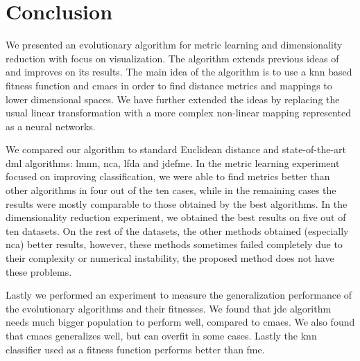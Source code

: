 \documentclass[12pt,a4paper]{report}
\begin{document}








\chapter*{Conclusion} \label{chap:conclusion}

We presented an evolutionary algorithm for metric learning and dimensionality reduction with focus on visualization. The algorithm extends previous ideas of \cite{fukui2013evolutionary} and improves on its results. The main idea of the algorithm is to use a \ac{knn} based fitness function and \ac{cmaes} in order to find distance metrics and mappings to lower dimensional spaces. We have further extended the ideas by replacing the usual linear transformation with a more complex non-linear mapping represented as a neural networks.

We compared our algorithm to standard Euclidean distance and state-of-the-art \acl{dml} algorithms: \ac{lmnn}, \ac{nca}, \ac{lfda} and \ac{jdefme}. In the metric learning experiment focused on improving classification, we were able to find metrics better than other algorithms in four out of the ten cases, while in the remaining cases the results were mostly comparable to those obtained by the best algorithms. In the dimensionality reduction experiment, we obtained the best results on five out of ten datasets. On the rest of the datasets, the other methods obtained (especially \ac{nca}) better results, however, these methods sometimes failed completely due to their complexity or numerical instability, the proposed method does not have these problems.

Lastly we performed an experiment to measure the generalization performance of the evolutionary algorithms and their fitnesses. We found that \ac{jde} algorithm needs much bigger population to perform well, compared to \ac{cmaes}. We also found that \ac{cmaes} generalizes well, but can overfit in some cases. Lastly the \ac{knn} classifier used as a fitness function performs better than \acl{fme}.
\end{document}
